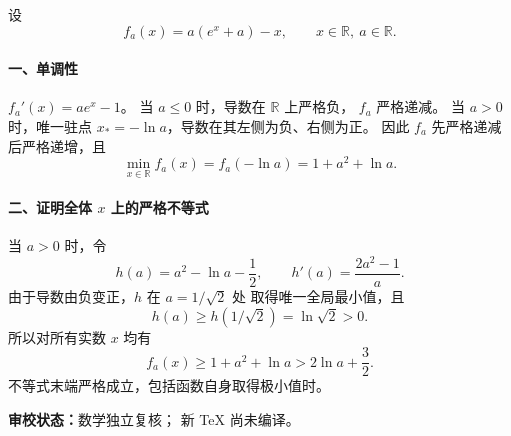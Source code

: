 \documentclass[UTF8,a4paper,11pt]{ctexart}
\renewcommand{\headrulewidth}{0.3pt}
\newcommand{\qtitle}[1]{\par\bigskip\noindent{\large\bfseries #1}\par\medskip}
\newcommand{\sourceurl}[1]{\par\noindent{\small\color{black!65}来源：\href{#1}{固定版本 LaTeX 源码（点击查看）}}\par}
\begin{document}
设
\[
f_a(x)=a(e^x+a)-x,\qquad x\in\mathbb R,\ a\in\mathbb R.
\]
\paragraph{一、单调性}
$f_a'(x)=ae^x-1$。
当 $a\le0$ 时，导数在 $\mathbb R$ 上严格负，
$f_a$ 严格递减。
当 $a>0$ 时，唯一驻点
$x_*=-\ln a$，导数在其左侧为负、右侧为正。
因此 $f_a$ 先严格递减后严格递增，且
\[
\min_{x\in\mathbb R}f_a(x)=f_a(-\ln a)
=1+a^2+\ln a.
\]

\paragraph{二、证明全体 $x$ 上的严格不等式}
当 $a>0$ 时，令
\[
h(a)=a^2-\ln a-\frac12,\qquad
h'(a)=\frac{2a^2-1}{a}.
\]
由于导数由负变正，$h$ 在 $a=1/\sqrt2$ 处
取得唯一全局最小值，且
\[
h(a)\ge h(1/\sqrt2)=\ln\sqrt2>0.
\]
所以对所有实数 $x$ 均有
\[
\boxed{f_a(x)\ge1+a^2+\ln a
>2\ln a+\frac32}.
\]
不等式末端严格成立，包括函数自身取得极小值时。

\bigskip
\noindent\textbf{审校状态：}数学独立复核；
新 TeX 尚未编译。

\clearpage
{}
{}
\end{document}
